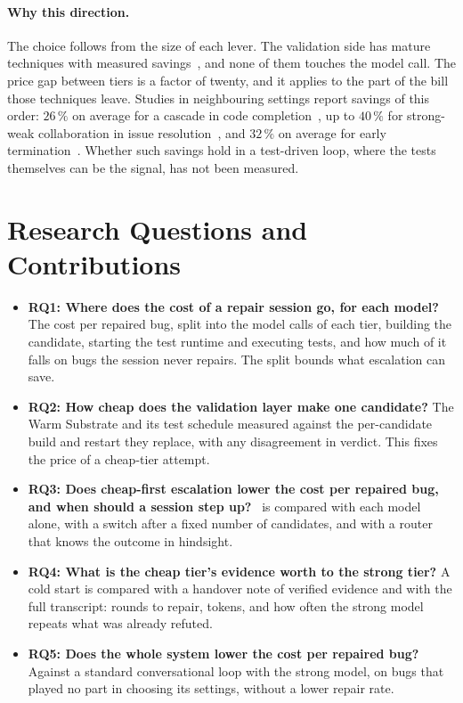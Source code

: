 \paragraph{Why this direction.} The choice follows from the size of each
lever. The validation side has mature techniques with measured
savings~\citep{chen2021uniapr,xiao2024expressapr,lou2024aprregression}, and
none of them touches the model call. The price gap between tiers is a factor
of twenty, and it applies to the part of the bill those techniques leave.
Studies in neighbouring settings report savings of this order: $26\,\%$ on
average for a cascade in code completion~\citep{chen2024cascading}, up to
$40\,\%$ for strong-weak collaboration in issue
resolution~\citep{gandhi2025strongweak}, and $32\,\%$ on average for early
termination~\citep{guo2026eet}. Whether such savings hold in a test-driven
loop, where the tests themselves can be the signal, has not been measured.

\section{Research Questions and Contributions}
\label{sec:intro-this}

\begin{itemize}
\item \textbf{RQ1: Where does the cost of a repair session go, for each
model?} The cost per repaired bug, split into the model calls of each tier,
building the candidate, starting the test runtime and executing tests, and how
much of it falls on bugs the session never repairs. The split bounds what
escalation can save.
\item \textbf{RQ2: How cheap does the validation layer make one candidate?}
The Warm Substrate and its test schedule measured against the per-candidate
build and restart they replace, with any disagreement in verdict. This fixes
the price of a cheap-tier attempt.
\item \textbf{RQ3: Does cheap-first escalation lower the cost per repaired
bug, and when should a session step up?} \Step\ is compared with each model
alone, with a switch after a fixed number of candidates, and with a router
that knows the outcome in hindsight.
\item \textbf{RQ4: What is the cheap tier's evidence worth to the strong
tier?} A cold start is compared with a handover note of verified evidence and
with the full transcript: rounds to repair, tokens, and how often the strong
model repeats what was already refuted.
\item \textbf{RQ5: Does the whole system lower the cost per repaired bug?}
Against a standard conversational loop with the strong model, on bugs that
played no part in choosing its settings, without a lower repair rate.
\end{itemize}

